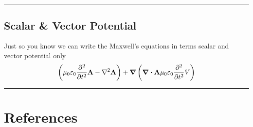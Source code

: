 \documentclass[12pt,english]{article}
\numberwithin{equation}{subsection}
\renewcommand{\vec}[1]{\mathbf{#1}}
\begin{document}
\par\noindent\rule{\textwidth}{0.4pt}
\subsection{Scalar \& Vector Potential}
Just so you know we can write the Maxwell's equations in terms scalar and vector potential only
\begin{equation}
    \left( \mu_0 \varepsilon_0 \pdv[2]{}{t}\vec{A} - \laplacian \vec{A}   \right) + \grad \left( \div \vec{A} \mu_0 \varepsilon_0 \pdv[2]{}{t} V \right)
\end{equation}
\par\noindent\rule{\textwidth}{0.4pt}



































































\newpage
\section*{References}
%
\printbibliography
[heading = none]

\end{document}
